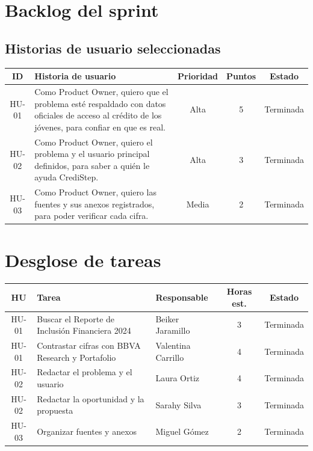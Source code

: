 \documentclass[11pt,a4paper]{article}
\begin{document}
\section{Backlog del sprint}

\subsection{Historias de usuario seleccionadas}

\begin{tabularx}{\textwidth}{c X c c c}
  \toprule
  \textbf{ID} & \textbf{Historia de usuario} & \textbf{Prioridad} & \textbf{Puntos} & \textbf{Estado} \\
  \midrule
  HU-01 & Como Product Owner, quiero que el problema esté respaldado con datos oficiales de acceso al crédito de los jóvenes, para confiar en que es real. & Alta & 5 & Terminada \\
  HU-02 & Como Product Owner, quiero el problema y el usuario principal definidos, para saber a quién le ayuda CrediStep. & Alta & 3 & Terminada \\
  HU-03 & Como Product Owner, quiero las fuentes y sus anexos registrados, para poder verificar cada cifra. & Media & 2 & Terminada \\
  \bottomrule
\end{tabularx}

\section{Desglose de tareas}

\begin{tabularx}{\textwidth}{c X l c c}
  \toprule
  \textbf{HU} & \textbf{Tarea} & \textbf{Responsable} & \textbf{Horas est.} & \textbf{Estado} \\
  \midrule
  HU-01 & Buscar el Reporte de Inclusión Financiera 2024 & Beiker Jaramillo & 3 & Terminada \\
  HU-01 & Contrastar cifras con BBVA Research y Portafolio & Valentina Carrillo & 4 & Terminada \\
  HU-02 & Redactar el problema y el usuario & Laura Ortiz & 4 & Terminada \\
  HU-02 & Redactar la oportunidad y la propuesta & Sarahy Silva & 3 & Terminada \\
  HU-03 & Organizar fuentes y anexos & Miguel Gómez & 2 & Terminada \\
  \bottomrule
\end{tabularx}
\end{document}
